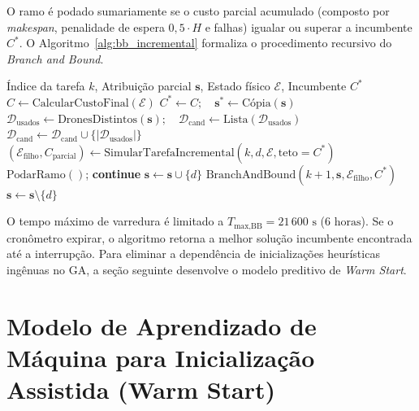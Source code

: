 O ramo é podado sumariamente se o custo parcial acumulado (composto por \textit{makespan}, penalidade de espera $0{,}5 \cdot H$ e falhas) igualar ou superar a incumbente $C^*$. O Algoritmo~\ref{alg:bb_incremental} formaliza o procedimento recursivo do \textit{Branch and Bound}.

\begin{algorithm}[htbp]
\caption{Branch and Bound Incremental com Quebra de Simetria}\label{alg:bb_incremental}
\begin{algorithmic}[1]
\REQUIRE Índice da tarefa $k$, Atribuição parcial $\mathbf{s}$, Estado físico $\mathcal{E}$, Incumbente $C^*$
 \RETURN \ENDIF
{}
    \STATE $C \leftarrow \text{CalcularCustoFinal}(\mathcal{E})$
     $C^* \leftarrow C; \quad \mathbf{s}^* \leftarrow \text{Cópia}(\mathbf{s})$ \ENDIF
    \RETURN
\ENDIF
\STATE $\mathcal{D}_{\text{usados}} \leftarrow \text{DronesDistintos}(\mathbf{s}); \quad \mathcal{D}_{\text{cand}} \leftarrow \text{Lista}(\mathcal{D}_{\text{usados}})$
 $\mathcal{D}_{\text{cand}} \leftarrow \mathcal{D}_{\text{cand}} \cup \{|\mathcal{D}_{\text{usados}}|\}$ \ENDIF {}
    \STATE $(\mathcal{E}_{\text{filho}}, C_{\text{parcial}}) \leftarrow \text{SimularTarefaIncremental}(k, d, \mathcal{E}, \text{teto}=C^*)$
        \STATE $\text{PodarRamo}()$; \textbf{continue}
    \ENDIF
    \STATE $\mathbf{s} \leftarrow \mathbf{s} \cup \{d\}$
    \STATE $\text{BranchAndBound}(k + 1, \mathbf{s}, \mathcal{E}_{\text{filho}}, C^*)$
    \STATE $\mathbf{s} \leftarrow \mathbf{s} \setminus \{d\}$
\ENDFOR
\end{algorithmic}
\end{algorithm}

O tempo máximo de varredura é limitado a $T_{\text{max,BB}} = 21\,600\text{ s}$ ($6\text{ horas}$). Se o cronômetro expirar, o algoritmo retorna a melhor solução incumbente encontrada até a interrupção. Para eliminar a dependência de inicializações heurísticas ingênuas no GA, a seção seguinte desenvolve o modelo preditivo de \textit{Warm Start}.

\section{Modelo de Aprendizado de Máquina para Inicialização Assistida (Warm Start)}\label{sec:dev_ml_warmstart}

